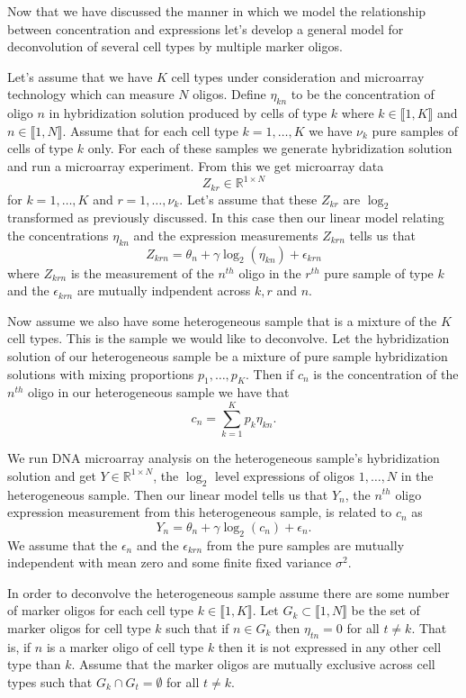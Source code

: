 \documentclass[reqno,12pt,oneside]{report}\usepackage[]{graphicx}\usepackage[]{color}
\theoremstyle{plain}
\theoremstyle{definition}
\theoremstyle{remark}
\numberwithin{theorem}{chapter}     %
\begin{document}
Now that we have discussed the manner in which we model the relationship between concentration and expressions let's develop a general model for deconvolution of several cell types by multiple marker oligos. 

Let's assume that we have $K$ cell types under consideration and microarray technology which can measure $N$ oligos. Define $\eta_{kn}$ to be the concentration of oligo $n$ in hybridization solution produced by cells of type $k$ where $k\in\llbracket 1,K\rrbracket$ and $n\in\llbracket 1,N\rrbracket$. Assume that for each cell type $k=1,\ldots,K$ we have $\nu_k$ pure samples of cells of type $k$ only. For each of these samples we generate hybridization solution and run a microarray experiment. From this we get microarray data 
\[
Z_{kr} \in \mathbb{R}^{1\times N}
\]
for $k=1,\ldots,K$ and $r=1,\ldots,\nu_k$. Let's assume that these $Z_{kr}$ are $\log_2$ transformed as previously discussed. In this case then our linear model relating the concentrations $\eta_{kn}$ and the expression measurements $Z_{krn}$ tells us that
\[
Z_{krn} = \theta_n + \gamma \log_2\left(\eta_{kn}\right)+\epsilon_{krn}
\]
where $Z_{krn}$ is the measurement of the $n^{th}$ oligo in the $r^{th}$ pure sample of type $k$ and the $\epsilon_{krn}$ are mutually indpendent across $k,r$ and $n$.

Now assume we also have some heterogeneous sample that is a mixture of the $K$ cell types. This is the sample we would like to deconvolve. Let the hybridization solution of our heterogeneous sample be a mixture of pure sample hybridization solutions with mixing proportions $p_1,\ldots,p_K$. Then if $c_n$ is the concentration of the $n^{th}$ oligo in our heterogeneous sample we have that 
\[
c_n = \sum_{k=1}^{K}p_k\eta_{kn}.
\]

We run DNA microarray analysis on the heterogeneous sample's hybridization solution and get $Y\in\mathbb{R}^{1\times N}$, the $\log_2$ level expressions of oligos $1,\ldots,N$ in the heterogeneous sample. Then our linear model tells us that $Y_n$, the $n^{th}$ oligo expression measurement from this heterogeneous sample, is related to $c_n$ as
\[
Y_n = \theta_n + \gamma\log_2\left(c_n\right)+\epsilon_n.
\]
We assume that the $\epsilon_n$ and the $\epsilon_{krn}$ from the pure samples are mutually independent with mean zero and some finite fixed variance $\sigma^2$.

In order to deconvolve the heterogeneous sample assume there are some number of marker oligos for each cell type $k\in\llbracket1, K\rrbracket$. Let $G_k\subset\llbracket 1, N\rrbracket$ be the set of marker oligos for cell type $k$ such that if $n \in G_k$ then $\eta_{tn}=0$ for all $t \neq k$. That is, if $n$ is a marker oligo of cell type $k$ then it is not expressed in any other cell type than $k$. Assume that the marker oligos are mutually exclusive across cell types such that $G_k\cap G_t=\emptyset$ for all $t \neq k$. 
\end{document}
